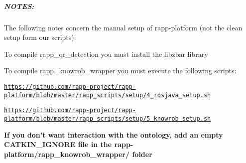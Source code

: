 \subparagraph*{N\-O\-T\-E\-S\-:}

The following notes concern the manual setup of rapp-\/platform (not the clean setup form our scripts)\-:


\begin{DoxyItemize}
\item To compile {\ttfamily rapp\-\_\-qr\-\_\-detection} you must install the {\ttfamily libzbar} library
\item To compile {\ttfamily rapp\-\_\-knowrob\-\_\-wrapper} you must execute the following scripts\-:
\begin{DoxyItemize}
\item \href{https://github.com/rapp-project/rapp-platform/blob/master/rapp_scripts/setup/4_rosjava_setup.sh}{\tt https\-://github.\-com/rapp-\/project/rapp-\/platform/blob/master/rapp\-\_\-scripts/setup/4\-\_\-rosjava\-\_\-setup.\-sh}
\item \href{https://github.com/rapp-project/rapp-platform/blob/master/rapp_scripts/setup/5_knowrob_setup.sh}{\tt https\-://github.\-com/rapp-\/project/rapp-\/platform/blob/master/rapp\-\_\-scripts/setup/5\-\_\-knowrob\-\_\-setup.\-sh}
\item {\bfseries If you don't want interaction with the ontology, add an empty {\ttfamily C\-A\-T\-K\-I\-N\-\_\-\-I\-G\-N\-O\-R\-E} file in the {\ttfamily rapp-\/platform/rapp\-\_\-knowrob\-\_\-wrapper/} folder} 
\end{DoxyItemize}
\end{DoxyItemize}